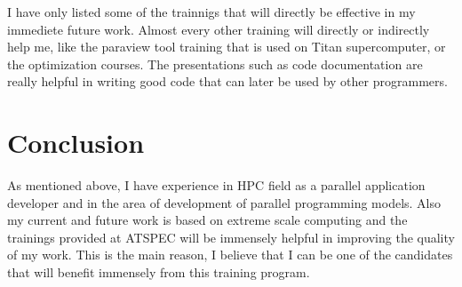 \documentclass[margin]{res}
\begin{document}
I have only listed some of the trainnigs that will directly be effective in my immediete future work.
Almost every other training will directly or indirectly help me, like the paraview tool training that is used on Titan supercomputer, or the optimization courses.
The presentations such as code documentation are really helpful in writing good code that can later be used by other programmers.
%
\section{Conclusion}
 As mentioned above, I have experience in HPC field as a parallel application developer and in the area of development of parallel programming models.
 Also my current and future work is based on extreme scale computing and the trainings provided at ATSPEC will be immensely helpful in improving the quality of my work.
%
 This is the main reason, I believe that I can be one of the candidates that will benefit immensely from this training program.

\end{document}
